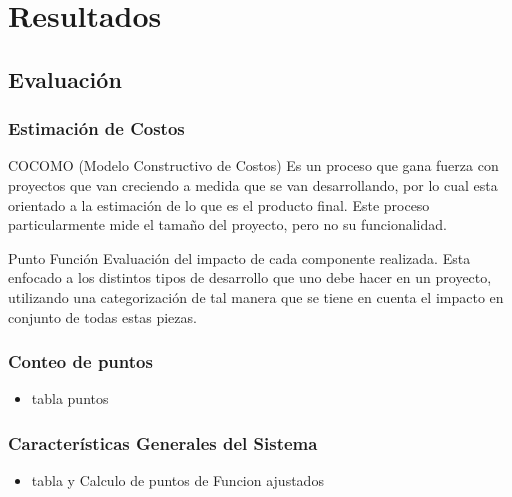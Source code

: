 \documentclass{beamer}
\begin{document}

\section{Resultados} 

\subsection{Evaluación}


\begin{frame}
\frametitle{Estimación de Costos}
\begin{block}{COCOMO (Modelo Constructivo de Costos)}
Es un proceso que gana fuerza con proyectos que van creciendo a medida que se van desarrollando, por lo cual esta orientado a la estimación de lo que es el producto final. Este proceso particularmente mide el tamaño del proyecto, pero no su funcionalidad.
\end{block}
\begin{block}{Punto Función}
Evaluación del impacto de cada componente realizada. Esta enfocado a los distintos tipos de desarrollo que uno debe hacer en un proyecto, utilizando una categorización de tal manera que se tiene en cuenta el impacto en conjunto de todas estas piezas.
\end{block}
\end{frame}


\begin{frame}
\frametitle{Conteo de puntos}
\begin{itemize}
\item tabla puntos
\end{itemize}
\end{frame}


\begin{frame}
\frametitle{Características Generales del Sistema}
\begin{itemize}
\item tabla y Calculo de puntos de Funcion ajustados
\end{itemize}
\end{frame}

\end{document}
